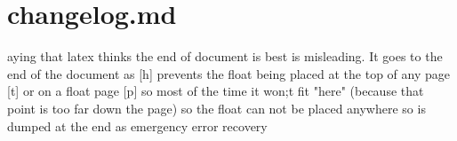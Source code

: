 \section{changelog.md}

aying that latex thinks the end of document is best is misleading. It goes to the end of the document as [h] prevents the float being placed at the top of any page [t] or on a float page [p] so most of the time it won;t fit "here" (because that point is too far down the page) so the float can not be placed anywhere so is dumped at the end as emergency error recovery
